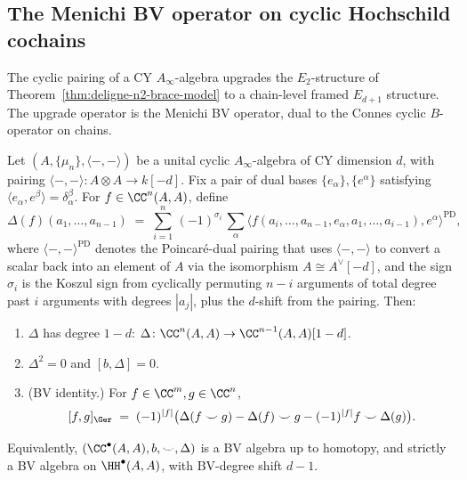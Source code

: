 \subsection{The Menichi BV operator on cyclic Hochschild cochains}
\label{subsec:menichi-bv-operator}

The cyclic pairing of a CY $A_\infty$-algebra upgrades the $E_2$-structure of Theorem~\ref{thm:deligne-n2-brace-model} to a chain-level framed $E_{d+1}$ structure. The upgrade operator is the Menichi BV operator, dual to the Connes cyclic $B$-operator on chains.

\begin{proposition}
\label{prop:menichi-delta-explicit}
Let $(A, \{\mu_n\}, \langle-,-\rangle)$ be a unital cyclic $A_\infty$-algebra of CY dimension $d$, with pairing $\langle-,-\rangle \colon A \otimes A \to k[-d]$. Fix a pair of dual bases $\{e_\alpha\}, \{e^\alpha\}$ satisfying $\langle e_\alpha, e^\beta\rangle = \delta_\alpha^\beta$. For $f \in \CC^n(A,A)$, define
\begin{equation}\label{eq:menichi-delta-explicit}
 \Delta(f)(a_1, \ldots, a_{n-1})
 \;=\;
 \sum_{i = 1}^{n}\, (-1)^{\sigma_i}\,
 \sum_\alpha \langle f(a_i, \ldots, a_{n-1}, e_\alpha, a_1, \ldots, a_{i-1}), e^\alpha\rangle^{\mathrm{PD}},
\end{equation}
where $\langle-,-\rangle^{\mathrm{PD}}$ denotes the Poincar\'e-dual pairing that uses $\langle-,-\rangle$ to convert a scalar back into an element of $A$ via the isomorphism $A \cong A^\vee[-d]$, and the sign $\sigma_i$ is the Koszul sign from cyclically permuting $n - i$ arguments of total degree past $i$ arguments with degrees $|a_j|$, plus the $d$-shift from the pairing. Then:
\begin{enumerate}[label=\textup{(\roman*)}]
\item $\Delta$ has degree $1 - d$: $\Delta \colon \CC^n(A,A) \to \CC^{n-1}(A,A)[1-d]$.
\item $\Delta^2 = 0$ and $[b, \Delta] = 0$.
\item \textup{(BV identity.)} For $f \in \CC^m, g \in \CC^n$,
\begin{equation}\label{eq:bv-identity}
 [f, g]_\Ger
 \;=\; (-1)^{|f|}\bigl(\Delta(f \smile g) - \Delta(f)\smile g - (-1)^{|f|} f \smile \Delta(g)\bigr).
\end{equation}
\end{enumerate}
Equivalently, $(\CC^\bullet(A,A), b, \smile, \Delta)$ is a BV algebra up to homotopy, and strictly a BV algebra on $\HH^\bullet(A,A)$, with BV-degree shift $d - 1$.
\end{proposition}

